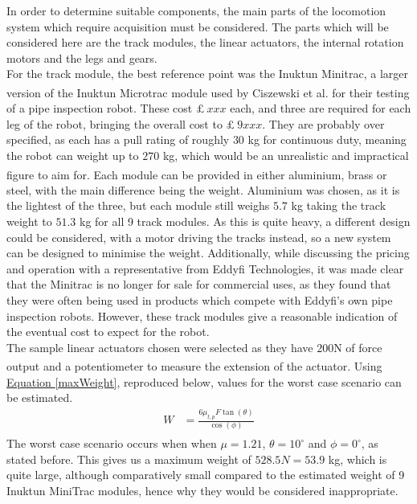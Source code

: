 \documentclass[11pt]{article}		%
\newcommand{\supercite}[1]{\textsuperscript{\cite{#1}}}		%
\newcommand{\equationref}[1]{\hyperref[#1]{Equation \ref*{#1}}}     %
\begin{document}
		In order to determine suitable components, the main parts of the locomotion system which require acquisition must be considered.
		The parts which will be considered here are the track modules, the linear actuators, the internal rotation motors and the legs and gears.
		\\
		For the track module, the best reference point was the Inuktun Minitrac, a larger version of the Inuktun Microtrac module used by Ciszewski et al.\supercite{ciszewski2015design} for their testing of a pipe inspection robot.
		These cost $£ \ xxx$ each, and three are required for each leg of the robot, bringing the overall cost to $£ \ 9xxx$.
		They are probably over specified, as each has a pull rating of roughly $30$ kg for continuous duty, meaning the robot can weight up to $270$ kg, which would be an unrealistic and impractical figure to aim for\supercite{inuktunTracks}.
		Each module can be provided in either aluminium, brass or steel, with the main difference being the weight.
		Aluminium was chosen, as it is the lightest of the three, but each module still weighs $5.7$ kg taking the track weight to $51.3$ kg for all 9 track modules.
		As this is quite heavy, a different design could be considered, with a motor driving the tracks instead, so a new system can be designed to minimise the weight.
		Additionally, while discussing the pricing and operation with a representative from Eddyfi Technologies, it was made clear that the Minitrac is no longer for sale for commercial uses, as they found that they were often being used in products which compete with Eddyfi's own pipe inspection robots.
		However, these track modules give a reasonable indication of the eventual cost to expect for the robot.
		\\
		The sample linear actuators chosen were selected as they have $200$N of force output and a potentiometer to measure the extension of the actuator\supercite{rsproLinear}.
		Using \equationref{maxWeight}, reproduced below, values for the worst case scenario can be estimated.
		\begin{align*}
			W &= \frac{6 \mu_{t,p} F \tan \left( \theta \right)}{\cos \left( \phi \right)}
		\end{align*}
		The worst case scenario occurs when when $ \mu = 1.21$\supercite{sato2011development}, $\theta = 10^\circ$ and $\phi = 0^\circ$, as stated before.
		This gives us a maximum weight of $528.5 N = 53.9$ kg, which is quite large, although comparatively small compared to the estimated weight of 9 Inuktun MiniTrac modules, hence why they would be considered inappropriate.
\end{document}
